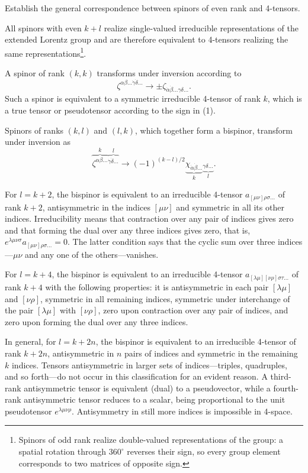 \ProblemHeading

Establish the general correspondence between spinors of even rank and 4-tensors.

\SolutionHeading All spinors with even $k+l$ realize single-valued irreducible representations of the extended Lorentz group and are therefore equivalent to 4-tensors realizing the same representations\footnote{Spinors of odd rank realize double-valued representations of the group: a spatial rotation through $360^\circ$ reverses their sign, so every group element corresponds to two matrices of opposite sign.}.

A spinor of rank $(k,k)$ transforms under inversion according to
\begin{equation}
\zeta^{\alpha\beta\ldots\dot\gamma\dot\delta\ldots}
\to\pm\zeta_{\dot\alpha\dot\beta\ldots\gamma\delta\ldots}.
\tag{1}
\end{equation}
Such a spinor is equivalent to a symmetric irreducible 4-tensor of rank $k$, which is a true tensor or pseudotensor according to the sign in (1).

Spinors of ranks $(k,l)$ and $(l,k)$, which together form a bispinor, transform under inversion as
\begin{equation}
\overbrace{\zeta^{\alpha\beta\ldots}}^{k}
\overbrace{{}^{\dot\gamma\dot\delta\ldots}}^{l}
\to(-1)^{(k-l)/2}
\underbrace{\chi_{\dot\alpha\dot\beta\ldots}}_{k}
\underbrace{{}_{\gamma\delta\ldots}}_{l}.
\tag{2}
\end{equation}

For $l=k+2$, the bispinor is equivalent to an irreducible 4-tensor $a_{[\mu\nu]\rho\sigma\ldots}$ of rank $k+2$, antisymmetric in the indices $[\mu\nu]$ and symmetric in all its other indices. Irreducibility means that contraction over any pair of indices gives zero and that forming the dual over any three indices gives zero, that is, $e^{\lambda\mu\nu\sigma}a_{[\mu\nu]\rho\sigma\ldots}=0$. The latter condition says that the cyclic sum over three indices---$\mu\nu$ and any one of the others---vanishes.

For $l=k+4$, the bispinor is equivalent to an irreducible 4-tensor $a_{[\lambda\mu][\nu\rho]\sigma\tau\ldots}$ of rank $k+4$ with the following properties: it is antisymmetric in each pair $[\lambda\mu]$ and $[\nu\rho]$, symmetric in all remaining indices, symmetric under interchange of the pair $[\lambda\mu]$ with $[\nu\rho]$, zero upon contraction over any pair of indices, and zero upon forming the dual over any three indices.

In general, for $l=k+2n$, the bispinor is equivalent to an irreducible 4-tensor of rank $k+2n$, antisymmetric in $n$ pairs of indices and symmetric in the remaining $k$ indices. Tensors antisymmetric in larger sets of indices---triples, quadruples, and so forth---do not occur in this classification for an evident reason. A third-rank antisymmetric tensor is equivalent (dual) to a pseudovector, while a fourth-rank antisymmetric tensor reduces to a scalar, being proportional to the unit pseudotensor $e^{\lambda\mu\nu\rho}$. Antisymmetry in still more indices is impossible in 4-space.
